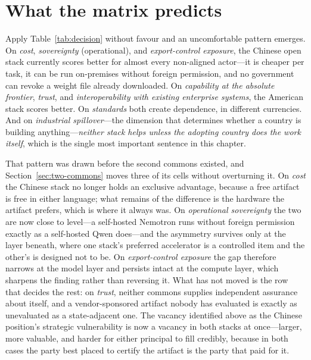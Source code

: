 \section{What the matrix predicts}

Apply Table~\ref{tab:decision} without favour and an uncomfortable pattern emerges. On \emph{cost}, \emph{sovereignty} (operational), and \emph{export-control exposure}, the Chinese open stack currently scores better for almost every non-aligned actor---it is cheaper per task, it can be run on-premises without foreign permission, and no government can revoke a weight file already downloaded. On \emph{capability at the absolute frontier}, \emph{trust}, and \emph{interoperability with existing enterprise systems}, the American stack scores better. On \emph{standards} both create dependence, in different currencies. And on \emph{industrial spillover}---the dimension that determines whether a country is building anything---\emph{neither stack helps unless the adopting country does the work itself}, which is the single most important sentence in this chapter.

That pattern was drawn before the second commons existed, and Section~\ref{sec:two-commons} moves three of its cells without overturning it. On \emph{cost} the Chinese stack no longer holds an exclusive advantage, because a free artifact is free in either language; what remains of the difference is the hardware the artifact prefers, which is where it always was. On \emph{operational sovereignty} the two are now close to level---a self-hosted Nemotron runs without foreign permission exactly as a self-hosted Qwen does---and the asymmetry survives only at the layer beneath, where one stack's preferred accelerator is a controlled item and the other's is designed not to be. On \emph{export-control exposure} the gap therefore narrows at the model layer and persists intact at the compute layer, which sharpens the finding rather than reversing it. What has not moved is the row that decides the rest: on \emph{trust}, neither commons supplies independent assurance about itself, and a vendor-sponsored artifact nobody has evaluated is exactly as unevaluated as a state-adjacent one. The vacancy identified above as the Chinese position's strategic vulnerability is now a vacancy in both stacks at once---larger, more valuable, and harder for either principal to fill credibly, because in both cases the party best placed to certify the artifact is the party that paid for it.

